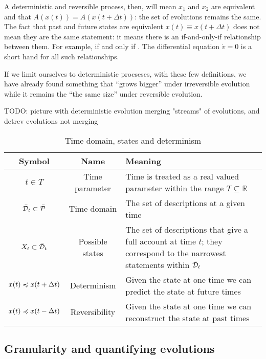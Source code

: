 \documentclass[letterpaper]{article}
\begin{document}
A deterministic and reversible process, then, will mean $x_1$ and $x_2$ are equivalent and that  $A(x(t)) = A(x(t + \Delta t))$: the set of evolutions remains the same. The fact that past and future states are equivalent $x(t) \equiv x(t + \Delta t)$ does not mean they are the same statement: it means there is an if-and-only-if relationship between them. For example,  if and only if . The differential equation $\dot{v} = 0$ is a short hand for all such relationships.

If we limit ourselves to deterministic procseses, with these few definitions, we have already found something that ``grows bigger'' under irreversible evolution while it remains the ``the same size'' under reversible evolution.

TODO: picture with deterministic evolution merging "streams" of evolutions, and detrev evolutions not merging

\begin{table}[h!]
	\centering
	\begin{tabular}[h]{|c|c|p{6cm}|}
		\hline 
		Symbol & Name & Meaning \\ 
		\hline 
		$t \in T$ & Time parameter & Time is treated as a real valued parameter within the range $T \subseteq \mathbb{R}$ \\ 
		\hline 
		$\tdomain_t \subset \tdomain[P]$ & Time domain & The set of descriptions at a given time \\ 
		\hline 
		$X_t \subset \tdomain_t$ & Possible states & The set of descriptions that give a full account at time $t$; they correspond to the narrowest statements within $\tdomain_t$ \\ 
		\hline 
		$x(t) \narrower x(t + \Delta t)$ & Determinism & Given the state at one time we can predict the state at future times \\ 
		\hline 
		$x(t) \narrower x(t - \Delta t)$ & Reversibility & Given the state at one time we can reconstruct the state at past times \\ 
		\hline 
	\end{tabular} 
	\caption{Time domain, states and determinism}
	\label{table:states}
\end{table}

\subsection{Granularity and quantifying evolutions}
\end{document}
